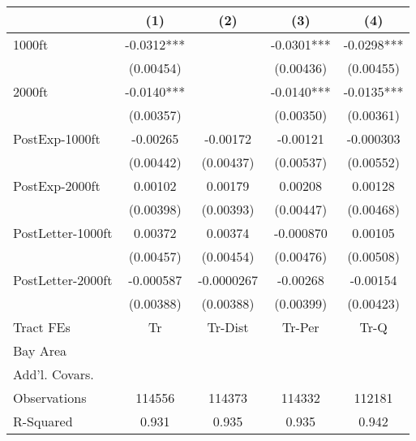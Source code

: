 {
\def\sym#1{\ifmmode^{#1}\else\(^{#1}\)\fi}
\begin{tabular}{l*{4}{c}}
\toprule
                    &\multicolumn{1}{c}{(1)}   &\multicolumn{1}{c}{(2)}   &\multicolumn{1}{c}{(3)}   &\multicolumn{1}{c}{(4)}   \\
\midrule
1000ft              &     -0.0312***&               &     -0.0301***&     -0.0298***\\
                    &   (0.00454)   &               &   (0.00436)   &   (0.00455)   \\
\addlinespace
2000ft              &     -0.0140***&               &     -0.0140***&     -0.0135***\\
                    &   (0.00357)   &               &   (0.00350)   &   (0.00361)   \\
\addlinespace
PostExp-1000ft      &    -0.00265   &    -0.00172   &    -0.00121   &   -0.000303   \\
                    &   (0.00442)   &   (0.00437)   &   (0.00537)   &   (0.00552)   \\
\addlinespace
PostExp-2000ft      &     0.00102   &     0.00179   &     0.00208   &     0.00128   \\
                    &   (0.00398)   &   (0.00393)   &   (0.00447)   &   (0.00468)   \\
\addlinespace
PostLetter-1000ft   &     0.00372   &     0.00374   &   -0.000870   &     0.00105   \\
                    &   (0.00457)   &   (0.00454)   &   (0.00476)   &   (0.00508)   \\
\addlinespace
PostLetter-2000ft   &   -0.000587   &  -0.0000267   &    -0.00268   &    -0.00154   \\
                    &   (0.00388)   &   (0.00388)   &   (0.00399)   &   (0.00423)   \\
\midrule
Tract FEs           &          Tr   &     Tr-Dist   &      Tr-Per   &        Tr-Q   \\
Bay Area            &               &               &               &               \\
Add'l. Covars.      &               &               &               &               \\
Observations        &      114556   &      114373   &      114332   &      112181   \\
R-Squared           &       0.931   &       0.935   &       0.935   &       0.942   \\
\bottomrule
\end{tabular}
}
